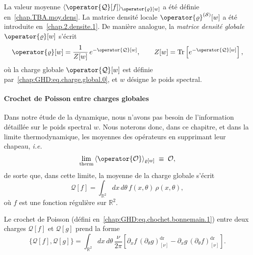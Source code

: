 \medskip

La valeur moyenne $\langle \operator{\mathcal{Q}}[f] \rangle_{\operator{\varrho}[w]}$ a été définie en~\eqref{chap.TBA.moy.dens}.  
La matrice densité locale $\operator{\varrho}^{(\mathcal{S})}[w]$ a été introduite en~\eqref{chap.2.densite.1}.  
De manière analogue, la \emph{matrice densité globale} $\operator{\varrho}[w]$ s’écrit
\begin{equation}\label{chap:GHD:eq.charge.global.2}
	\operator{\varrho}[w] 
	= \frac{1}{Z[w]}\, e^{-\operator{\mathcal{Q}}[w]}, 
	\qquad  
	Z[w] = \mathrm{Tr} \left[ e^{-\operator{\mathcal{Q}}[w]} \right],
\end{equation}
où la charge globale $\operator{\mathcal{Q}}[w]$ est définie par~\eqref{chap:GHD:eq.charge.global.0}, et $w$ désigne le poids spectral.  


\medskip

\paragraph{Crochet de Poisson entre charges globales}  
Dans notre étude de la dynamique, nous n’avons pas besoin de l’information détaillée sur le poids spectral $w$.  
Nous noterons donc, dans ce chapitre, et dans la limite thermodynamique, les moyennes des opérateurs en supprimant leur chapeau, \emph{i.e.}
\begin{equation}
\underset{\mathrm{therm}}{\lim} \, \langle \operator{\mathcal{O}} \rangle_{\varrho[w]} \; \equiv \; \mathcal{O},
\end{equation}
de sorte que, dans cette limite, la moyenne de la charge globale s’écrit
\begin{equation}\label{chap:GHD:eq.charge.global.1}
	\mathcal{Q}[f] 
	= \int_{\mathbb{R}^2} dx\, d\theta\, f(x, \theta)\, \rho(x, \theta),
\end{equation}
où $f$ est une fonction régulière sur $\mathbb{R}^2$.

\medskip

Le crochet de Poisson (défini en~\eqref{chap:GHD:eq.chochet.bonnemain.1}) entre deux charges $\mathcal{Q}[f]$ et $\mathcal{Q}[g]$ prend la forme
\begin{equation}\label{chap:GHD:eq.chochet.bonnemain.2}
	\{\mathcal{Q}[f], \mathcal{Q}[g]\}
	= \int_{\mathbb{R}^2} dx\, d\theta\, \frac{\nu}{2\pi} 
	\left[ \partial_x f \, (\partial_\theta g)^{\mathrm{dr}}_{[\nu]} 
	     - \partial_x g \, (\partial_\theta f)^{\mathrm{dr}}_{[\nu]} \right].
\end{equation}

